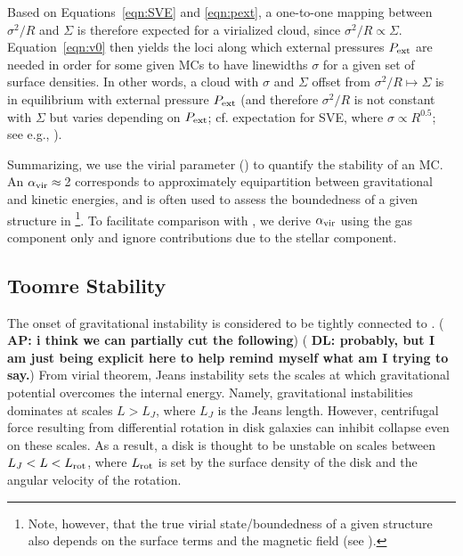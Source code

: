 \IfFileExists{emulateapjlegacy.cls}{\documentclass[iop]{emulateapjlegacy}}{\documentclass[iop]{emulateapj}}
\newcommand{\AP}[1]{({\bf \color{apcolor} AP: #1})}
\newcommand{\DL}[1]{({\bf \color{dlcolor} DL: #1})}
\begin{document}
Based on Equations~\ref{eqn:SVE} and \ref{eqn:pext}, a one-to-one mapping
between $\sigma^2/R$ and $\Sigma$ is therefore expected for a virialized cloud,
since $\sigma^2/R\propto\Sigma$. Equation~\ref{eqn:v0}
then yields the loci along which external pressures $P_{\rm ext}$ are needed in order for some given MCs to have
linewidths $\sigma$ for a given set of surface densities. %
In other words, a cloud with $\sigma$ and $\Sigma$ offset from $\sigma^2/R\mapsto\Sigma$ is in equilibrium with
external pressure $P_{\rm ext}$ (and therefore $\sigma^2/R$ is not constant
with $\Sigma$ but varies depending on $P_{\rm ext}$; cf.
expectation for SVE, where $\sigma\propto R^{0.5}$; see e.g., \citealt{Heyer09a, Hughes10a, Hughes13b, Meidt13a}).

Summarizing, we use the virial parameter () to quantify the stability of an MC.
An $\alpha_{\rm vir}\approx$\,2 corresponds to approximately equipartition between gravitational and kinetic energies, and is
 often used to assess the boundedness of a given structure in \obs \citep[see e.g., ][]{Kauffmann17b}\footnote{Note, however, that the true virial state/boundedness of a given structure also depends on the surface terms and the magnetic field (see ).}.
To facilitate comparison with \obs, we derive $\alpha_{\rm vir}$ using the gas component only and ignore contributions due to
the stellar component.

\subsection{Toomre Stability}\label{sec:Q}

The onset of gravitational instability is considered to be tightly connected to \SF \citep[e.g.,][]{Kennicutt89a, Wang94a, Li05b, Li06a}. \AP{i think we can partially cut the following} \DL{probably, but I am just being explicit here to help remind myself what am I trying to say.}
From virial theorem, Jeans instability sets the scales at which gravitational potential overcomes the internal energy. Namely, gravitational instabilities dominates at scales $L > L_J$, where $L_J$ is the Jeans length. However, centrifugal force resulting from differential rotation in disk galaxies can inhibit collapse even on these scales. As a result, a disk is thought to be unstable on scales between $L_J < L < L_{\rm rot}$, where $L_{\rm rot}$ is set by the surface density of the disk and the angular velocity of the rotation.
\end{document}
